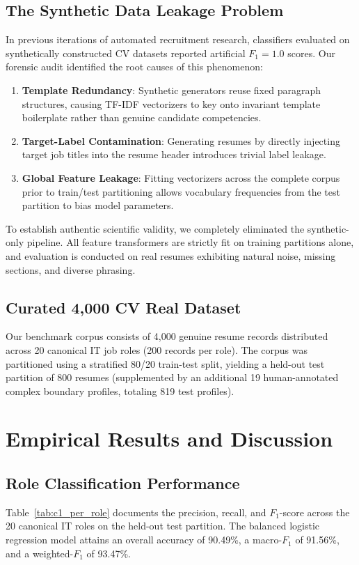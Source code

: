 \documentclass[conference]{IEEEtran}
\begin{document}
\subsection{The Synthetic Data Leakage Problem}
In previous iterations of automated recruitment research, classifiers evaluated on synthetically constructed CV datasets reported artificial $F_1 = 1.0$ scores. Our forensic audit identified the root causes of this phenomenon:
\begin{enumerate}
    \item \textbf{Template Redundancy}: Synthetic generators reuse fixed paragraph structures, causing TF-IDF vectorizers to key onto invariant template boilerplate rather than genuine candidate competencies.
    \item \textbf{Target-Label Contamination}: Generating resumes by directly injecting target job titles into the resume header introduces trivial label leakage.
    \item \textbf{Global Feature Leakage}: Fitting vectorizers across the complete corpus prior to train/test partitioning allows vocabulary frequencies from the test partition to bias model parameters.
\end{enumerate}

To establish authentic scientific validity, we completely eliminated the synthetic-only pipeline. All feature transformers are strictly fit on training partitions alone, and evaluation is conducted on real resumes exhibiting natural noise, missing sections, and diverse phrasing.

\subsection{Curated 4,000 CV Real Dataset}
Our benchmark corpus consists of 4,000 genuine resume records distributed across 20 canonical IT job roles (200 records per role). The corpus was partitioned using a stratified 80/20 train-test split, yielding a held-out test partition of 800 resumes (supplemented by an additional 19 human-annotated complex boundary profiles, totaling 819 test profiles).

\section{Empirical Results and Discussion}
\subsection{Role Classification Performance}
Table~\ref{tab:c1_per_role} documents the precision, recall, and $F_1$-score across the 20 canonical IT roles on the held-out test partition. The balanced logistic regression model attains an overall accuracy of 90.49\%, a macro-$F_1$ of 91.56\%, and a weighted-$F_1$ of 93.47\%.
\end{document}
